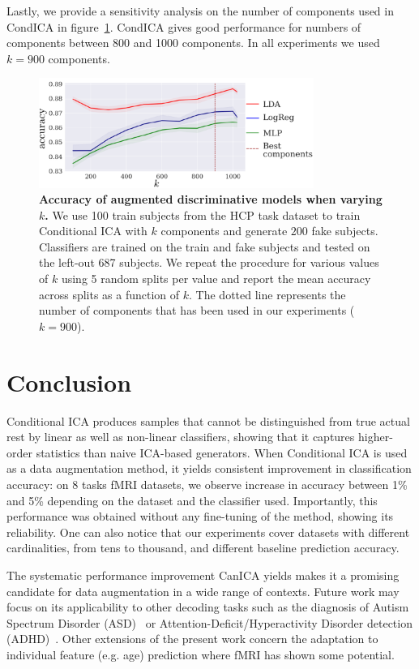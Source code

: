 Lastly, we provide a sensitivity analysis on the number of components used in
CondICA in figure~\ref{condica:sensitivity:fig}.
CondICA gives good performance for numbers of components between 800 and 1000
components. In all experiments we used $k=900$ components.

\begin{figure}
  \centerline{\includegraphics[width=0.8\textwidth]{figures/condica/sensitivity.pdf}}
  \caption{\textbf{Accuracy of augmented discriminative models when
      varying $k$.} We use 100 train subjects from the HCP task dataset to train Conditional ICA with $k$ components and generate $200$ fake subjects.
    Classifiers are trained on the train and fake subjects and tested on the
    left-out 687 subjects. We repeat the procedure
    for various values of $k$ using 5 random splits per value and
    report the mean accuracy across splits as a function of $k$.
    The dotted line represents the number of components that has been
    used in our experiments ($k=900$).
  }
  \label{condica:sensitivity:fig}
\end{figure}






\section{Conclusion}
Conditional ICA produces samples that cannot be distinguished from true actual rest by linear as well as non-linear classifiers, showing that it captures higher-order statistics than naive ICA-based generators.
%
When Conditional ICA is used as a data augmentation method, it yields consistent
improvement in classification accuracy: on 8 tasks fMRI datasets, we observe
increase in accuracy between 1\% and 5\% depending on the dataset and the
classifier used.
Importantly, this performance was obtained without any fine-tuning of
the method, showing its reliability. One can also notice that our experiments cover datasets with different cardinalities, from tens to thousand, and different baseline prediction accuracy.

The systematic performance improvement CanICA yields
makes it a promising candidate for data augmentation in a wide range of
contexts. Future work may focus on its applicability to other decoding tasks
such as the diagnosis of Autism Spectrum Disorder
(ASD)~\cite{eslami2019asd,eslami2019auto,dvornek2017identifying} or
Attention-Deficit/Hyperactivity Disorder detection (ADHD)~\cite{mao2019spatio}. Other extensions of the present work concern the adaptation to
individual feature (e.g. age) prediction where
fMRI has shown some potential.
%